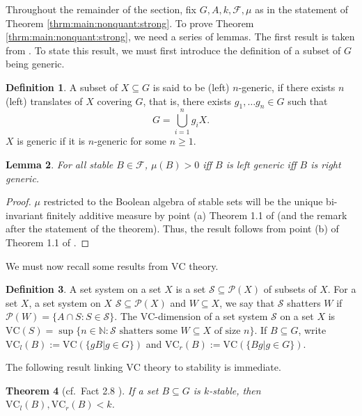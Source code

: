 \documentclass[11pt]{amsart}
\newtheorem{theorem}{Theorem}[section]
\newtheorem{lemma}[theorem]{Lemma}
\theoremstyle{definition}
\newtheorem{definition}[theorem]{Definition}
\theoremstyle{remark}
\def\NN{\mathbb{N}}
\begin{document}
Throughout the remainder of the section, fix $G,A,k, \mathcal{F}, \mu$ as in the statement of Theorem \ref{thrm:main:nonquant:strong}. To prove Theorem \ref{thrm:main:nonquant:strong}, we need a series of lemmas. The first result is taken from \cite{Conant:2021:stability:in:group}. To state this result, we must first introduce the definition of a subset of $G$ being generic.
\begin{definition}
    A subset of $X \subseteq G$ is said to be (left) $n$-generic, if there exists $n$ (left) translates of $X$ covering $G$, that is, there exists $g_1,\ldots g_n \in G$ such that 
    \[
    G= \bigcup_{i = 1}^n g_iX.
    \]
    $X$ is generic if it is $n$-generic for some $n\ge 1$.
\end{definition}
\begin{lemma}
\label{lem:pos:gen}
    For all stable $B \in \mathcal{F}$, $\mu(B) >0$ iff $B$ is left  generic iff $B$ is right generic.
\end{lemma}
\begin{proof}
     $\mu$ restricted to the Boolean algebra of stable sets will be the unique bi-invariant finitely additive measure by point (a) Theorem 1.1 of \cite{Conant:2021:stability:in:group} (and the remark after the statement of the theorem). Thus, the result follows from point (b) of Theorem 1.1 of \cite{Conant:2021:stability:in:group}.
\end{proof}
 We must now recall some results from $\mathrm{VC}$ theory.

\begin{definition}
A set system on a set $X$ is a set $\mathcal{S} \subseteq \mathcal{P}(X)$ of subsets of $X$. For a set $X$, a set system on $X$ $\mathcal{S} \subseteq \mathcal{P}(X)$ and $W \subseteq X$, we say that $\mathcal{S}$ shatters $W$ if $\mathcal{P}(W) =\{A \cap S : S \in \mathcal{S}\}$. The $\mathrm{VC}$-dimension of a set system $\mathcal{S}$ on a set $X$ is $\mathrm{VC}(S) = \sup\{n \in \NN : \mathcal{S} \mbox{ shatters some } W \subseteq X \mbox{ of size }n\}$. If $B \subseteq G$, write $\mathrm{VC}_l(B):= \mathrm{VC}(\{gB|g \in G\})$ and $\mathrm{VC}_r(B):= \mathrm{VC}(\{Bg|g \in G\})$.
\end{definition}

The following result linking $\mathrm{VC}$ theory to stability is immediate.

\begin{theorem}[cf.\ Fact 2.8 \cite{conant2021quantitative}]
\label{thrm:stab:vc}
    If a set $B \subseteq G$ is $k$-stable, then $\mathrm{VC}_l(B), \mathrm{VC}_r(B) < k$.
\end{theorem}
\end{document}
